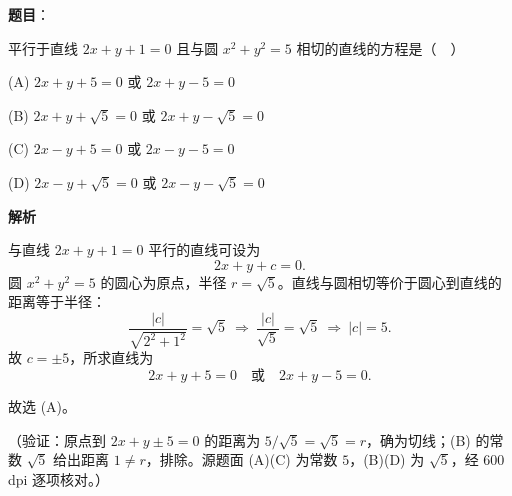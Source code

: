 \begin{answer}

\textbf{题目}：

平行于直线 \(2x+y+1=0\) 且与圆 \(x^2+y^2=5\) 相切的直线的方程是（　）

(A) \(2x+y+5=0\) 或 \(2x+y-5=0\)

(B) \(2x+y+\sqrt{5}=0\) 或 \(2x+y-\sqrt{5}=0\)

(C) \(2x-y+5=0\) 或 \(2x-y-5=0\)

(D) \(2x-y+\sqrt{5}=0\) 或 \(2x-y-\sqrt{5}=0\)

\textbf{解析}

与直线 \(2x+y+1=0\) 平行的直线可设为
\nopagebreak[4]
\[
2x+y+c=0.
\]
圆 \(x^2+y^2=5\) 的圆心为原点，半径 \(r=\sqrt{5}\)。直线与圆相切等价于圆心到直线的距离等于半径：
\nopagebreak[4]
\[
\frac{|c|}{\sqrt{2^2+1^2}}=\sqrt{5}
\ \Longrightarrow\ \frac{|c|}{\sqrt{5}}=\sqrt{5}
\ \Longrightarrow\ |c|=5.
\]
故 \(c=\pm5\)，所求直线为
\nopagebreak[4]
\[
2x+y+5=0\quad\text{或}\quad 2x+y-5=0.
\]

故选 (A)。

（验证：原点到 \(2x+y\pm5=0\) 的距离为 \(5/\sqrt{5}=\sqrt{5}=r\)，确为切线；(B) 的常数 \(\sqrt{5}\) 给出距离 \(1\ne r\)，排除。源题面 (A)(C) 为常数 \(5\)，(B)(D) 为 \(\sqrt{5}\)，经 600 dpi 逐项核对。）


\end{answer}
